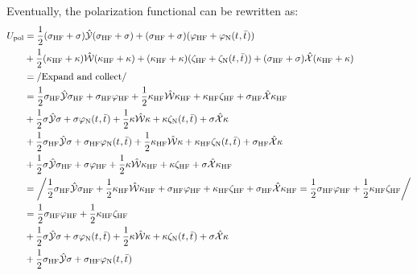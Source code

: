 Eventually, the polarization functional can be rewritten as:
\begin{equation}
  \begin{aligned}
  U_\mathrm{pol} &=
  \frac{1}{2}(\sigma_\mathrm{HF}+\sigma)\PCM(\sigma_\mathrm{HF}+\sigma)
+ (\sigma_\mathrm{HF}+\sigma)(\esp_\mathrm{HF}+\esp_{\mathrm{N}}(\tamp{},\tbar{})) \\
&+ \frac{1}{2}(\kappa_\mathrm{HF}+\kappa)\MM(\kappa_\mathrm{HF}+\kappa)
+ (\kappa_\mathrm{HF}+\kappa)(\zeta_\mathrm{HF}+\zeta_{\mathrm{N}}(\tamp{},\tbar{}))
+ (\sigma_\mathrm{HF}+\sigma)\bi{X}(\kappa_\mathrm{HF}+\kappa) \\
&= \left/ \text{Expand and collect} \right/ \\
&=
    \frac{1}{2}\sigma_\mathrm{HF}\PCM\sigma_\mathrm{HF}
  + \sigma_\mathrm{HF}\esp_\mathrm{HF}
  + \frac{1}{2}\kappa_\mathrm{HF}\MM\kappa_\mathrm{HF}
  + \kappa_\mathrm{HF}\zeta_\mathrm{HF}
  + \sigma_\mathrm{HF}\bi{X}\kappa_\mathrm{HF} \\
&+  \frac{1}{2}\sigma\PCM\sigma
  + \sigma\esp_{\mathrm{N}}(\tamp{},\tbar{})
  + \frac{1}{2}\kappa\MM\kappa
  + \kappa\zeta_{\mathrm{N}}(\tamp{},\tbar{})
  + \sigma\bi{X}\kappa \\
&+  \frac{1}{2}\sigma_\mathrm{HF}\PCM\sigma
  + \sigma_\mathrm{HF}\esp_{\mathrm{N}}(\tamp{},\tbar{})
  + \frac{1}{2}\kappa_\mathrm{HF}\MM\kappa
  + \kappa_\mathrm{HF}\zeta_{\mathrm{N}}(\tamp{},\tbar{})
  + \sigma_\mathrm{HF}\bi{X}\kappa \\
&+  \frac{1}{2}\sigma\PCM\sigma_\mathrm{HF}
  + \sigma\esp_\mathrm{HF}
  + \frac{1}{2}\kappa\MM\kappa_\mathrm{HF}
  + \kappa\zeta_\mathrm{HF}
  + \sigma\bi{X}\kappa_\mathrm{HF} \\
&= \left/
  \frac{1}{2}\sigma_\mathrm{HF}\PCM\sigma_\mathrm{HF}
  +
  \frac{1}{2}\kappa_\mathrm{HF}\MM\kappa_\mathrm{HF}
  +
  \sigma_\mathrm{HF}\esp_\mathrm{HF}
  +
  \kappa_\mathrm{HF}\zeta_\mathrm{HF}
  +
  \sigma_\mathrm{HF}\bi{X}\kappa_\mathrm{HF}
  =
  \frac{1}{2}\sigma_\mathrm{HF}\esp_\mathrm{HF}
  +
  \frac{1}{2}\kappa_\mathrm{HF}\zeta_\mathrm{HF}
  \right/ \\
&=
    \frac{1}{2}\sigma_\mathrm{HF}\esp_\mathrm{HF}
  + \frac{1}{2}\kappa_\mathrm{HF}\zeta_\mathrm{HF} \\
&+  \frac{1}{2}\sigma\PCM\sigma
  + \sigma\esp_{\mathrm{N}}(\tamp{},\tbar{})
  + \frac{1}{2}\kappa\MM\kappa
  + \kappa\zeta_{\mathrm{N}}(\tamp{},\tbar{})
  + \sigma\bi{X}\kappa \\
&+  \frac{1}{2}\sigma_\mathrm{HF}\PCM\sigma
  + \sigma_\mathrm{HF}\esp_{\mathrm{N}}(\tamp{},\tbar{})

\end{aligned}
\end{equation}
